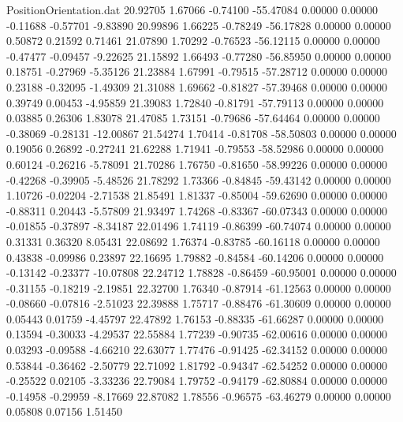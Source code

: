 \begin{filecontents}{PositionOrientation.dat}
  20.92705    1.67066   -0.74100   -55.47084    0.00000    0.00000   -0.11688   -0.57701   -9.83890
  20.99896    1.66225   -0.78249   -56.17828    0.00000    0.00000    0.50872    0.21592    0.71461
  21.07890    1.70292   -0.76523   -56.12115    0.00000    0.00000   -0.47477   -0.09457   -9.22625
  21.15892    1.66493   -0.77280   -56.85950    0.00000    0.00000    0.18751   -0.27969   -5.35126
  21.23884    1.67991   -0.79515   -57.28712    0.00000    0.00000    0.23188   -0.32095   -1.49309
  21.31088    1.69662   -0.81827   -57.39468    0.00000    0.00000    0.39749    0.00453   -4.95859
  21.39083    1.72840   -0.81791   -57.79113    0.00000    0.00000    0.03885    0.26306    1.83078
  21.47085    1.73151   -0.79686   -57.64464    0.00000    0.00000   -0.38069   -0.28131  -12.00867
  21.54274    1.70414   -0.81708   -58.50803    0.00000    0.00000    0.19056    0.26892   -0.27241
  21.62288    1.71941   -0.79553   -58.52986    0.00000    0.00000    0.60124   -0.26216   -5.78091
  21.70286    1.76750   -0.81650   -58.99226    0.00000    0.00000   -0.42268   -0.39905   -5.48526
  21.78292    1.73366   -0.84845   -59.43142    0.00000    0.00000    1.10726   -0.02204   -2.71538
  21.85491    1.81337   -0.85004   -59.62690    0.00000    0.00000   -0.88311    0.20443   -5.57809
  21.93497    1.74268   -0.83367   -60.07343    0.00000    0.00000   -0.01855   -0.37897   -8.34187
  22.01496    1.74119   -0.86399   -60.74074    0.00000    0.00000    0.31331    0.36320    8.05431
  22.08692    1.76374   -0.83785   -60.16118    0.00000    0.00000    0.43838   -0.09986    0.23897
  22.16695    1.79882   -0.84584   -60.14206    0.00000    0.00000   -0.13142   -0.23377  -10.07808
  22.24712    1.78828   -0.86459   -60.95001    0.00000    0.00000   -0.31155   -0.18219   -2.19851
  22.32700    1.76340   -0.87914   -61.12563    0.00000    0.00000   -0.08660   -0.07816   -2.51023
  22.39888    1.75717   -0.88476   -61.30609    0.00000    0.00000    0.05443    0.01759   -4.45797
  22.47892    1.76153   -0.88335   -61.66287    0.00000    0.00000    0.13594   -0.30033   -4.29537
  22.55884    1.77239   -0.90735   -62.00616    0.00000    0.00000    0.03293   -0.09588   -4.66210
  22.63077    1.77476   -0.91425   -62.34152    0.00000    0.00000    0.53844   -0.36462   -2.50779
  22.71092    1.81792   -0.94347   -62.54252    0.00000    0.00000   -0.25522    0.02105   -3.33236
  22.79084    1.79752   -0.94179   -62.80884    0.00000    0.00000   -0.14958   -0.29959   -8.17669
  22.87082    1.78556   -0.96575   -63.46279    0.00000    0.00000    0.05808    0.07156    1.51450

\end{filecontents}
